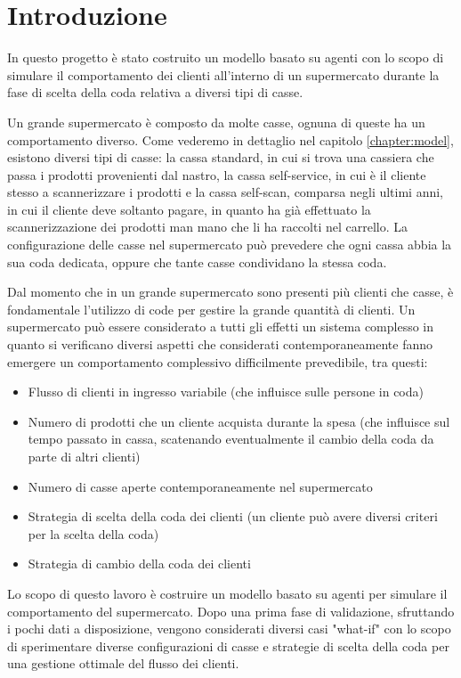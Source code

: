 \chapter{Introduzione}

In questo progetto è stato costruito un modello basato su agenti con lo scopo di simulare il comportamento dei clienti all'interno di un supermercato durante la fase di scelta della coda relativa a diversi tipi di casse.

Un grande supermercato è composto da molte casse, ognuna di queste ha un comportamento diverso. Come vederemo in dettaglio nel capitolo \ref{chapter:model}, esistono diversi tipi di casse: la cassa standard, in cui si trova una cassiera che passa i prodotti provenienti dal nastro, la cassa self-service, in cui è il cliente stesso a scannerizzare i prodotti e la cassa self-scan, comparsa negli ultimi anni, in cui il cliente deve soltanto pagare, in quanto ha già effettuato la scannerizzazione dei prodotti man mano che li ha raccolti nel carrello. La configurazione delle casse nel supermercato può prevedere che ogni cassa abbia la sua coda dedicata, oppure che tante casse condividano la stessa coda.

Dal momento che in un grande supermercato sono presenti più clienti che casse, è fondamentale l'utilizzo di code per gestire la grande quantità di clienti.  Un supermercato può essere considerato a tutti gli effetti un sistema complesso in quanto si verificano diversi aspetti che considerati contemporaneamente fanno emergere un comportamento complessivo difficilmente prevedibile, tra questi:
\begin{itemize}
	\item Flusso di clienti in ingresso variabile (che influisce sulle persone in coda)
	\item Numero di prodotti che un cliente acquista durante la spesa (che influisce sul tempo passato in cassa, scatenando eventualmente il cambio della coda da parte di altri clienti)
	\item Numero di casse aperte contemporaneamente nel supermercato
	\item Strategia di scelta della coda dei clienti (un cliente può avere diversi criteri per la scelta della coda)
	\item Strategia di cambio della coda dei clienti
\end{itemize}


Lo scopo di questo lavoro è costruire un modello basato su agenti per simulare il comportamento del supermercato. Dopo una prima fase di validazione, sfruttando i pochi dati a disposizione, vengono considerati diversi casi "what-if" con lo scopo di sperimentare diverse configurazioni di casse e strategie di scelta della coda per una gestione ottimale del flusso dei clienti. 

